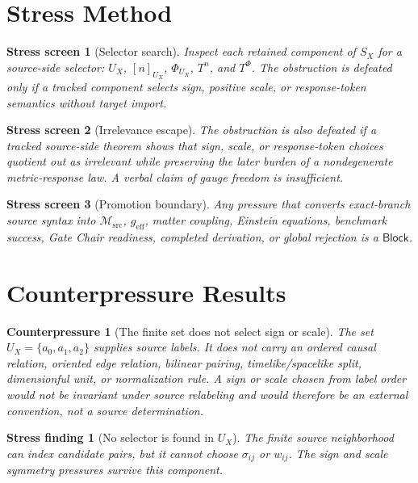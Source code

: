 \documentclass[11pt]{article}
\newcommand{\Msrc}{\mathcal{M}_{\mathrm{src}}}
\newcommand{\geff}{g_{\mathrm{eff}}}
\newcommand{\Block}{\mathsf{Block}}
\newtheorem{stressscreen}{Stress screen}
\newtheorem{counterpressure}{Counterpressure}
\newtheorem{stressfinding}{Stress finding}
\begin{document}
\section{Stress Method}

\begin{stressscreen}[Selector search]
Inspect each retained component of \(S_X\) for a source-side selector:
\(U_X\), \([n]_{U_X}\), \(\Phi_{U_X}\), \(T^n\), and \(T^\Phi\).
The obstruction is defeated only if a tracked component selects sign,
positive scale, or response-token semantics without target import.
\end{stressscreen}

\begin{stressscreen}[Irrelevance escape]
The obstruction is also defeated if a tracked source-side theorem
shows that sign, scale, or response-token choices quotient out as
irrelevant while preserving the later burden of a nondegenerate
metric-response law. A verbal claim of gauge freedom is insufficient.
\end{stressscreen}

\begin{stressscreen}[Promotion boundary]
Any pressure that converts exact-branch source syntax into
\(\Msrc\), \(\geff\), matter coupling, Einstein equations, benchmark
success, Gate Chair readiness, completed derivation, or global
rejection is a \(\Block\).
\end{stressscreen}

\section{Counterpressure Results}

\begin{counterpressure}[The finite set does not select sign or scale]
The set \(U_X=\{a_0,a_1,a_2\}\) supplies source labels. It does not
carry an ordered causal relation, oriented edge relation, bilinear
pairing, timelike/spacelike split, dimensionful unit, or normalization
rule. A sign or scale chosen from label order would not be invariant
under source relabeling and would therefore be an external convention,
not a source determination.
\end{counterpressure}

\begin{stressfinding}[No selector is found in \(U_X\)]
The finite source neighborhood can index candidate pairs, but it
cannot choose \(\sigma_{ij}\) or \(w_{ij}\). The sign and scale
symmetry pressures survive this component.
\end{stressfinding}
\end{document}
